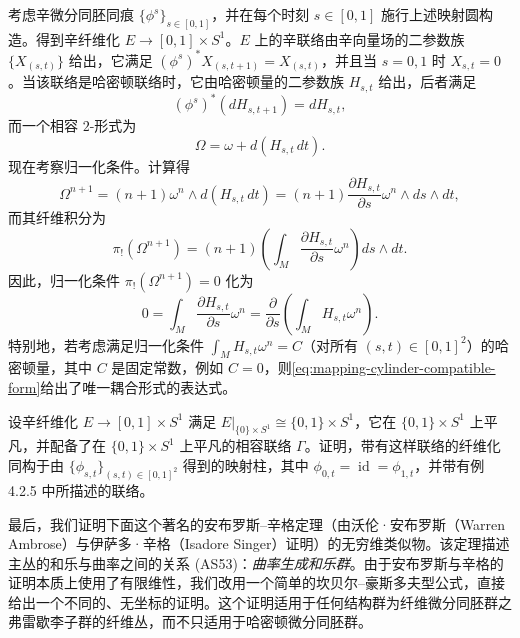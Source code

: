 \begin{example}[映射柱]\label{ex:mapping-cylinder}
考虑辛微分同胚同痕 $\{\phi^s\}_{s\in[0,1]}$，并在每个时刻
$s\in[0,1]$ 施行上述映射圆构造。得到辛纤维化
$E\to[0,1]\times S^1$。$E$ 上的辛联络由辛向量场的二参数族
$\{X_{(s,t)}\}$ 给出，它满足
$(\phi^s)^*X_{(s,t+1)}=X_{(s,t)}$，并且当 $s=0,1$ 时
$X_{s,t}=0$。当该联络是哈密顿联络时，它由哈密顿量的二参数族
$H_{s,t}$ 给出，后者满足
\[
 (\phi^s)^*(dH_{s,t+1})=dH_{s,t},
\]
而一个相容 $2$-形式为
\begin{equation}
 \Omega=\omega+d(H_{s,t}\,dt).
 \label{eq:mapping-cylinder-compatible-form}
\end{equation}
现在考察归一化条件。计算得
\[
 \Omega^{n+1}
 =(n+1)\omega^n\wedge d(H_{s,t}\,dt)
 =(n+1)\frac{\partial H_{s,t}}{\partial s}
   \omega^n\wedge ds\wedge dt,
\]
而其纤维积分为
\[
 \pi_!(\Omega^{n+1})
 =(n+1)\left(\int_M
   \frac{\partial H_{s,t}}{\partial s}\omega^n\right)ds\wedge dt.
\]
因此，归一化条件 $\pi_!(\Omega^{n+1})=0$ 化为
\begin{equation}
 0=\int_M\frac{\partial H_{s,t}}{\partial s}\omega^n
 =\frac{\partial}{\partial s}\left(\int_M H_{s,t}\omega^n\right).
 \label{eq:mapping-cylinder-normalization}
\end{equation}
特别地，若考虑满足归一化条件
$\int_M H_{s,t}\omega^n=C$（对所有 $(s,t)\in[0,1]^2$）的哈密顿量，其中
$C$ 是固定常数，例如 $C=0$，则\eqref{eq:mapping-cylinder-compatible-form}给出了唯一耦合形式的表达式。
\end{example}

\begin{exercise}\label{ex:mapping-cylinder-classification}
设辛纤维化 $E\to[0,1]\times S^1$ 满足
$E|_{\{0\}\times S^1}\cong\{0,1\}\times S^1$，它在
$\{0,1\}\times S^1$ 上平凡，并配备了在 $\{0,1\}\times S^1$ 上平凡的相容联络 $\Gamma$。证明，带有这样联络的纤维化同构于由
$\{\phi_{s,t}\}_{(s,t)\in[0,1]^2}$ 得到的映射柱，其中
$\phi_{0,t}=\operatorname{id}=\phi_{1,t}$，并带有例 4.2.5 中所描述的联络。
\end{exercise}

最后，我们证明下面这个著名的安布罗斯--辛格定理（由沃伦·安布罗斯（Warren Ambrose）与伊萨多·辛格（Isadore Singer）证明）的无穷维类似物。该定理描述主丛的和乐与曲率之间的关系 (AS53)：\emph{曲率生成和乐群}。由于安布罗斯与辛格的证明本质上使用了有限维性，我们改用一个简单的坎贝尔--豪斯多夫型公式，直接给出一个不同的、无坐标的证明。这个证明适用于任何结构群为纤维微分同胚群之弗雷歇李子群的纤维丛，而不只适用于哈密顿微分同胚群。

